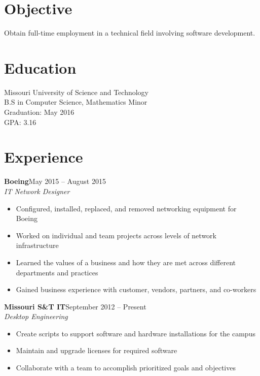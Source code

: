 \documentclass[margin]{res}
\begin{document}
  \begin{resume} 
    \section{Objective} 
      Obtain full-time employment in a technical field involving software development.

    \section{Education}
      Missouri University of Science and Technology \\ 
      B.S in Computer Science, Mathematics Minor \\
      Graduation: May 2016 \\
      GPA: 3.16

	\section{Experience}
       \textbf{Boeing}\hfill May 2015 -- August 2015 \\
       \textit{IT Network Designer}\hfill 
       \begin{itemize} \itemsep -1pt  %
         \item Configured, installed, replaced, and removed networking equipment for Boeing
         \item Worked on individual and team projects across levels of network infrastructure 
         \item Learned the values of a business and how they are met across different departments and practices
         \item Gained business experience with customer, vendors, partners, and co-workers
       \end{itemize}
       
    \textbf{Missouri S\&T IT}\hfill September 2012 -- Present\\
       \textit{Desktop Engineering}\hfill
       \begin{itemize} \itemsep -1pt  %
         \item Create scripts to support software and hardware installations for the campus
         \item Maintain and upgrade licenses for required software
         \item Collaborate with a team to accomplish prioritized goals and objectives
       \end{itemize}
   

\end{resume}
\end{document}
